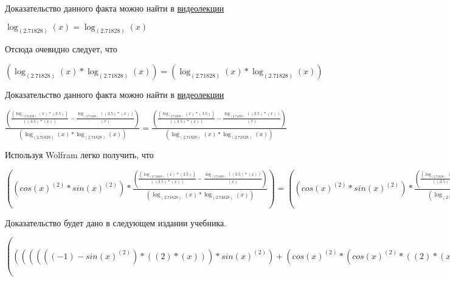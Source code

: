 \documentclass[12pt,a4paper,fleqn]{article}
\theoremstyle{definition}
\begin{document}
Доказательство данного факта можно найти в \href{https://www.youtube.com/watch?v=dQw4w9WgXcQ}{видеолекции}

$\log_{( 2.71828 )}{( x )} = \log_{( 2.71828 )}{( x )}$

Отсюда очевидно следует, что

$(\log_{( 2.71828 )}{( x )} * \log_{( 2.71828 )}{( x )}) = (\log_{( 2.71828 )}{( x )} * \log_{( 2.71828 )}{( x )})$

Доказательство данного факта можно найти в \href{https://www.youtube.com/watch?v=dQw4w9WgXcQ}{видеолекции}

$\frac{(\frac{(\log_{( 2.71828 )}{( x )} * ( 3.5 ))}{(( 3.5 ) * ( x ))}
 - \frac{\log_{( 2.71828 )}{(( 3.5 ) * ( x ))}}{( x )}
)}{(\log_{( 2.71828 )}{( x )} * \log_{( 2.71828 )}{( x )})}
 = \frac{(\frac{(\log_{( 2.71828 )}{( x )} * ( 3.5 ))}{(( 3.5 ) * ( x ))}
 - \frac{\log_{( 2.71828 )}{(( 3.5 ) * ( x ))}}{( x )}
)}{(\log_{( 2.71828 )}{( x )} * \log_{( 2.71828 )}{( x )})}
$

Используя Wolfram легко получить, что

$((cos{( x )}^{( 2 )} * sin{( x )}^{( 2 )}) * \frac{(\frac{(\log_{( 2.71828 )}{( x )} * ( 3.5 ))}{(( 3.5 ) * ( x ))}
 - \frac{\log_{( 2.71828 )}{(( 3.5 ) * ( x ))}}{( x )}
)}{(\log_{( 2.71828 )}{( x )} * \log_{( 2.71828 )}{( x )})}
) = ((cos{( x )}^{( 2 )} * sin{( x )}^{( 2 )}) * \frac{(\frac{(\log_{( 2.71828 )}{( x )} * ( 3.5 ))}{(( 3.5 ) * ( x ))}
 - \frac{\log_{( 2.71828 )}{(( 3.5 ) * ( x ))}}{( x )}
)}{(\log_{( 2.71828 )}{( x )} * \log_{( 2.71828 )}{( x )})}
)$

Доказательство будет дано в следующем издании учебника.

$((((((( -1 ) - sin{( x )}^{( 2 )}) * (( 2 ) * ( x ))) * sin{( x )}^{( 2 )}) + (cos{( x )}^{( 2 )} * (cos{( x )}^{( 2 )} * (( 2 ) * ( x ))))) * \log_{( x )}{(( 3.5 ) * ( x ))}) + ((cos{( x )}^{( 2 )} * sin{( x )}^{( 2 )}) * \frac{(\frac{(\log_{( 2.71828 )}{( x )} * ( 3.5 ))}{(( 3.5 ) * ( x ))}
 - \frac{\log_{( 2.71828 )}{(( 3.5 ) * ( x ))}}{( x )}
)}{(\log_{( 2.71828 )}{( x )} * \log_{( 2.71828 )}{( x )})}
)) = ((((((( -1 ) - sin{( x )}^{( 2 )}) * (( 2 ) * ( x ))) * sin{( x )}^{( 2 )}) + (cos{( x )}^{( 2 )} * (cos{( x )}^{( 2 )} * (( 2 ) * ( x ))))) * \log_{( x )}{(( 3.5 ) * ( x ))}) + ((cos{( x )}^{( 2 )} * sin{( x )}^{( 2 )}) * \frac{(\frac{(\log_{( 2.71828 )}{( x )} * ( 3.5 ))}{(( 3.5 ) * ( x ))}
 - \frac{\log_{( 2.71828 )}{(( 3.5 ) * ( x ))}}{( x )}
)}{(\log_{( 2.71828 )}{( x )} * \log_{( 2.71828 )}{( x )})}
))$
\end{document}
